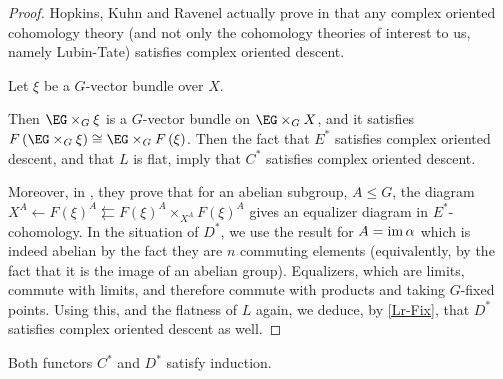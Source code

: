 \begin{proof}
	Hopkins, Kuhn and Ravenel actually prove in \cite[2.5]{HKR} that any complex oriented cohomology theory (and not only the cohomology theories of interest to us, namely Lubin-Tate) satisfies complex oriented descent.
	
	Let $\xi$ be a $G$-vector bundle over $X$.
	
	Then $\EG \times_G \xi$ is a $G$-vector bundle on $\EG \times_G X$, and it satisfies $F\left(\EG \times_G \xi\right) \cong \EG \times_G F\left(\xi\right)$.
	Then the fact that $E^*$ satisfies complex oriented descent, and that $L$ is flat, imply that $C^*$ satisfies complex oriented descent.
	
	Moreover, in \cite[2.6]{HKR}, they prove that for an abelian subgroup, $A \leq G$, the diagram $X^A \leftarrow F\left(\xi\right)^A \leftleftarrows F\left(\xi\right)^A \times_{X^A} F\left(\xi\right)^A$ gives an equalizer diagram in $E^*$-cohomology.
	In the situation of $D^*$, we use the result for $A = \operatorname{im} \alpha$ which is indeed abelian by the fact they are $n$ commuting elements (equivalently, by the fact that it is the image of an abelian group).
	Equalizers, which are limits, commute with limits, and therefore commute with products and taking $G$-fixed points.
	Using this, and the flatness of $L$ again, we deduce, by \ref{Lr-Fix}, that $D^*$ satisfies complex oriented descent as well.
\end{proof}

\begin{lemma}
	Both functors $C^*$ and $D^*$ satisfy induction.
\end{lemma}

